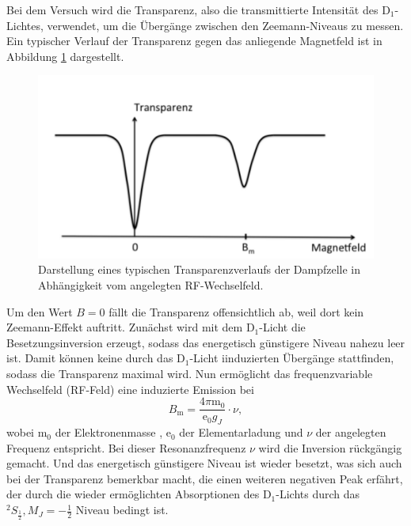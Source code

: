 Bei dem Versuch wird die Transparenz, also die transmittierte Intensität
des D$_1$-Lichtes, verwendet, um die Übergänge zwischen den Zeemann-Niveaus
zu messen.
Ein typischer Verlauf der Transparenz gegen das anliegende Magnetfeld
ist in Abbildung \ref{fig:transparenz} dargestellt.
\begin{figure}
  \centering
  \includegraphics[width=0.9\columnwidth]{pictures/transparenz.png}
  \caption{Darstellung eines typischen Transparenzverlaufs der Dampfzelle in Abhängigkeit vom angelegten RF-Wechselfeld. \cite{Anleitung}}
  \label{fig:transparenz}
\end{figure}
Um den Wert $B=0$ fällt die Transparenz offensichtlich ab, weil dort
kein Zeemann-Effekt auftritt.
Zunächst wird mit dem D$_1$-Licht die Besetzungsinversion erzeugt, sodass
das energetisch günstigere Niveau nahezu leer ist. Damit können keine
durch das D$_1$-Licht iinduzierten Übergänge stattfinden, sodass die
Transparenz maximal wird. Nun ermöglicht das frequenzvariable
Wechselfeld (RF-Feld) eine induzierte Emission bei
\begin{equation}
	\label{eqn:g_f}
	B_{\mathrm{m}} = \frac{4\pi \mathrm{m}_0}{\mathrm{e}_0 g_J}\cdot \nu \mathrm{,}
\end{equation}
wobei $\mathrm{m}_0$ der Elektronenmasse \cite{m_0}, $\mathrm{e}_0$ der
Elementarladung \cite{e} und $\nu$ der angelegten Frequenz entspricht.
Bei dieser Resonanzfrequenz $\nu$ wird die Inversion rückgängig gemacht.
Und das energetisch günstigere Niveau ist wieder besetzt, was sich auch
bei der Transparenz bemerkbar macht, die einen weiteren negativen Peak
erfährt, der durch die wieder ermöglichten Absorptionen des D$_1$-Lichts durch das
$^2S_{\frac{1}{2}}, M_J = -\frac{1}{2}$ Niveau bedingt ist.

